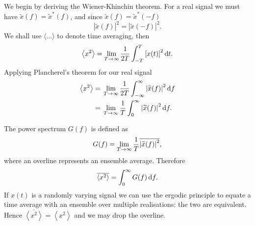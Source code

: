 We begin by deriving the Wiener-Khinchin theorem. For a real signal we must have $\widetilde{x}(f) = \widetilde{x}^\ast(f)$, and since $\widetilde{x}(f) = \widetilde{x}^\ast(-f)$
\begin{equation}
\left|\widetilde{x}(f)\right|^2 = \left|\widetilde{x}(-f)\right|^2.
\end{equation}
We shall use $\langle\ldots\rangle$ to denote time averaging, then
\begin{equation}
\left\langle x^2\right\rangle = \lim_{T \rightarrow \infty} \frac{1}{2T} \int_{-T}^{T}{\left[x(t)\right]^2}\,\mathrm{d}{t}.
\end{equation}
Applying Plancherel's theorem for our real signal
\begin{align}
\left\langle x^2\right\rangle = {} & \lim_{T \rightarrow \infty} \frac{1}{2T} \int_{-\infty}^{\infty}{\left|\widetilde{x}(f)\right|^2}\,\mathrm{d}{f} \nonumber \\
 = {} & \lim_{T \rightarrow \infty} \frac{1}{T} \int_{0}^{\infty}{\left|\widetilde{x}(f)\right|^2}\,\mathrm{d}{f}.
\end{align}

The power spectrum $G(f)$ is defined as
\begin{equation}
G(f) = \lim_{T \rightarrow \infty} \frac{1}{T} \overline{\left|\widetilde{x}(f)\right|^2},
\end{equation}
where an overline represents an ensemble average. Therefore
\begin{equation}
\overline{\left\langle x^2\right\rangle} = \int_{0}^{\infty}{G(f)}\,\mathrm{d}{f}.
\end{equation}
If $x(t)$ is a randomly varying signal we can use the ergodic principle to equate a time average with an ensemble over multiple realisations: the two are equivalent. Hence $\overline{\left\langle x^2\right\rangle} = \left\langle x^2\right\rangle$ and we may drop the overline.

